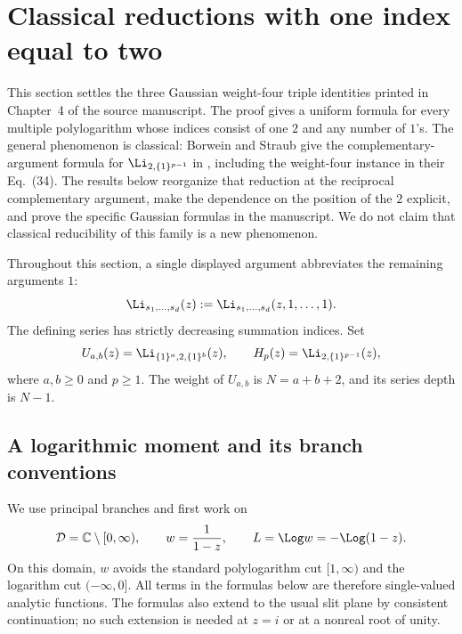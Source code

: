 \section{Classical reductions with one index equal to two}
\label{one2:sec:general}

This section settles the three Gaussian weight-four triple identities
printed in Chapter~4 of the source manuscript.  The proof gives a uniform
formula for every multiple polylogarithm whose indices consist of one
$2$ and any number of $1$'s.  The general phenomenon is classical:
Borwein and Straub give the complementary-argument formula for
$\Li_{2,\{1\}^{p-1}}$ in \cite[Eq.~(33)]{BorweinStraub2015}, including
the weight-four instance in their Eq.~(34).  The results below reorganize
that reduction at the reciprocal complementary argument, make the
dependence on the position of the $2$ explicit, and prove the specific
Gaussian formulas in the manuscript.  We do not claim that classical
reducibility of this family is a new phenomenon.

Throughout this section, a single displayed argument abbreviates the
remaining arguments $1$:
\[
 \Li_{s_1,\ldots,s_d}(z)
 :=\Li_{s_1,\ldots,s_d}(z,1,\ldots,1).
\]
The defining series has strictly decreasing summation indices.  Set
\[
 U_{a,b}(z)=\Li_{\{1\}^{a},2,\{1\}^{b}}(z),\qquad
 H_p(z)=\Li_{2,\{1\}^{p-1}}(z),
\]
where $a,b\ge0$ and $p\ge1$.  The weight of $U_{a,b}$ is
$N=a+b+2$, and its series depth is $N-1$.

\subsection{A logarithmic moment and its branch conventions}

We use principal branches and first work on
\[
 \mathcal D=\mathbb C\setminus[0,\infty),\qquad
 w=\frac1{1-z},\qquad L=\Log w=-\Log(1-z).
\]
On this domain, $w$ avoids the standard polylogarithm cut $[1,\infty)$
and the logarithm cut $(-\infty,0]$.  All terms in the formulas below
are therefore single-valued analytic functions.  The formulas also
extend to the usual slit plane by consistent continuation; no such
extension is needed at $z=i$ or at a nonreal root of unity.

